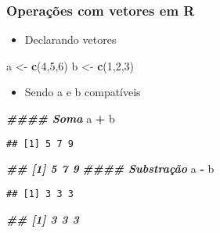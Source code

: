 \documentclass[
]{article}
\newenvironment{Shaded}{\begin{snugshade}}{\end{snugshade}}
\newcommand{\DecValTok}[1]{\textcolor[rgb]{0.00,0.00,0.81}{#1}}
\newcommand{\DocumentationTok}[1]{\textcolor[rgb]{0.56,0.35,0.01}{\textbf{\textit{#1}}}}
\newcommand{\FunctionTok}[1]{\textcolor[rgb]{0.13,0.29,0.53}{\textbf{#1}}}
\newcommand{\NormalTok}[1]{#1}
\newcommand{\OtherTok}[1]{\textcolor[rgb]{0.56,0.35,0.01}{#1}}
\newcommand{\SpecialCharTok}[1]{\textcolor[rgb]{0.81,0.36,0.00}{\textbf{#1}}}
\providecommand{\tightlist}{%
  \setlength{\itemsep}{0pt}\setlength{\parskip}{0pt}}
\begin{document}
\hypertarget{operauxe7uxf5es-com-vetores-em-r}{%
\subsubsection{Operações com vetores em
R}\label{operauxe7uxf5es-com-vetores-em-r}}

\begin{itemize}
\tightlist
\item
  Declarando vetores
\end{itemize}

\begin{Shaded}
\begin{Highlighting}[]
\NormalTok{a }\OtherTok{\textless{}{-}} \FunctionTok{c}\NormalTok{(}\DecValTok{4}\NormalTok{,}\DecValTok{5}\NormalTok{,}\DecValTok{6}\NormalTok{)}
\NormalTok{b }\OtherTok{\textless{}{-}} \FunctionTok{c}\NormalTok{(}\DecValTok{1}\NormalTok{,}\DecValTok{2}\NormalTok{,}\DecValTok{3}\NormalTok{)}
\end{Highlighting}
\end{Shaded}

\begin{itemize}
\tightlist
\item
  Sendo a e b compatíveis
\end{itemize}

\begin{Shaded}
\begin{Highlighting}[]
\DocumentationTok{\#\#\#\# Soma}
\NormalTok{a }\SpecialCharTok{+}\NormalTok{ b}
\end{Highlighting}
\end{Shaded}

\begin{verbatim}
## [1] 5 7 9
\end{verbatim}

\begin{Shaded}
\begin{Highlighting}[]
\DocumentationTok{\#\# [1] 5 7 9}
\DocumentationTok{\#\#\#\# Substração}
\NormalTok{a }\SpecialCharTok{{-}}\NormalTok{ b}
\end{Highlighting}
\end{Shaded}

\begin{verbatim}
## [1] 3 3 3
\end{verbatim}

\begin{Shaded}
\begin{Highlighting}[]
\DocumentationTok{\#\# [1] 3 3 3}
\end{Highlighting}
\end{Shaded}
\end{document}
